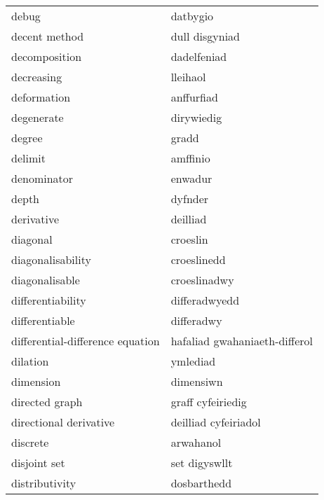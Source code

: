 \begin{supertabular}{p{0.22\textwidth}p{0.22\textwidth}}
                           debug &                        datbygio \\
                   decent method &                  dull disgyniad \\
                   decomposition &                     dadelfeniad \\
                      decreasing &                        lleihaol \\
                     deformation &                      anffurfiad \\
                      degenerate &                      dirywiedig \\
                          degree &                           gradd \\
                         delimit &                        amffinio \\
                     denominator &                         enwadur \\
                           depth &                         dyfnder \\
                      derivative &                        deilliad \\
                        diagonal &                        croeslin \\
               diagonalisability &                     croeslinedd \\
                  diagonalisable &                    croeslinadwy \\
               differentiability &                   differadwyedd \\
                  differentiable &                      differadwy \\
differential-difference equation &   hafaliad gwahaniaeth-differol \\
                        dilation &                        ymlediad \\
                       dimension &                       dimensiwn \\
                  directed graph &               graff cyfeiriedig \\
          directional derivative &            deilliad cyfeiriadol \\
                        discrete &                       arwahanol \\
                    disjoint set &                   set digyswllt \\
                  distributivity &                     dosbarthedd \\

\end{supertabular}
